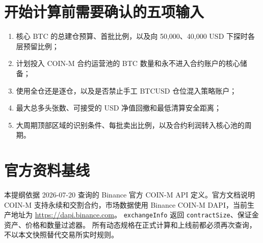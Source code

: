 \documentclass[11pt,a4paper,fontset=none]{ctexart}
\begin{document}
\section{开始计算前需要确认的五项输入}

\begin{enumerate}
  \item 核心 BTC 的总建仓预算、首批比例，以及向 50,000、40,000 USD 下探时各层预留比例；
  \item 计划投入 COIN-M 合约运营池的 BTC 数量和永不进入合约账户的核心储备；
  \item 使用全仓还是逐仓，以及是否禁止手工 BTCUSD 仓位混入策略账户；
  \item 最大总多头张数、可接受的 USD 净值回撤和最低清算安全距离；
  \item 大周期顶部区域的识别条件、每批卖出比例，以及合约利润转入核心池的周期。
\end{enumerate}

\section{官方资料基线}

本提纲依据 2026-07-20 查询的 Binance 官方 COIN-M API 定义。官方文档说明 COIN-M
支持永续和交割合约，市场数据使用 Binance COIN-M DAPI，当前生产地址为
\url{https://dapi.binance.com}。
\texttt{exchangeInfo} 返回 \texttt{contractSize}、保证金资产、价格和数量过滤器。
所有动态规格在正式计算和上线前都必须再次查询，不以本文快照替代交易所实时规则。
\end{document}
